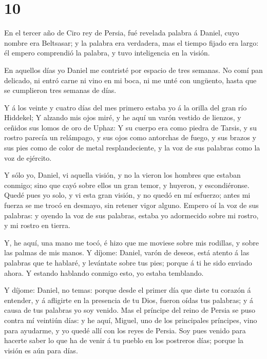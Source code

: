 \hypertarget{section-9}{%
\section{10}\label{section-9}}

 En el tercer año de Ciro rey de Persia, fué revelada
palabra á Daniel, cuyo nombre era Beltsasar; y la palabra era verdadera,
mas el tiempo fijado era largo: él empero comprendió la palabra, y tuvo
inteligencia en la visión.

 En aquellos días yo Daniel me contristé por espacio de tres
semanas.  No comí pan delicado, ni entró carne ni vino en mi
boca, ni me unté con ungüento, hasta que se cumplieron tres semanas de
días.

 Y á los veinte y cuatro días del mes primero estaba yo á la
orilla del gran río Hiddekel;  Y alzando mis ojos miré, y he
aquí un varón vestido de lienzos, y ceñidos sus lomos de oro de Uphaz:
 Y su cuerpo era como piedra de Tarsis, y su rostro parecía
un relámpago, y sus ojos como antorchas de fuego, y sus brazos y sus
pies como de color de metal resplandeciente, y la voz de sus palabras
como la voz de ejército.

 Y sólo yo, Daniel, vi aquella visión, y no la vieron los
hombres que estaban conmigo; sino que cayó sobre ellos un gran temor, y
huyeron, y escondiéronse.  Quedé pues yo solo, y vi esta
gran visión, y no quedó en mí esfuerzo; antes mi fuerza se me trocó en
desmayo, sin retener vigor alguno.  Empero oí la voz de sus
palabras: y oyendo la voz de sus palabras, estaba yo adormecido sobre mi
rostro, y mi rostro en tierra.

 Y, he aquí, una mano me tocó, é hizo que me moviese sobre
mis rodillas, y sobre las palmas de mis manos.  Y díjome:
Daniel, varón de deseos, está atento á las palabras que te hablaré, y
levántate sobre tus pies; porque á ti he sido enviado ahora. Y estando
hablando conmigo esto, yo estaba temblando.

 Y díjome: Daniel, no temas: porque desde el primer día que
diste tu corazón á entender, y á afligirte en la presencia de tu Dios,
fueron oídas tus palabras; y á causa de tus palabras yo soy venido.
 Mas el príncipe del reino de Persia se puso contra mí
veintiún días: y he aquí, Miguel, uno de los principales príncipes, vino
para ayudarme, y yo quedé allí con los reyes de Persia. 
Soy pues venido para hacerte saber lo que ha de venir á tu pueblo en los
postreros días; porque la visión es aún para días.

